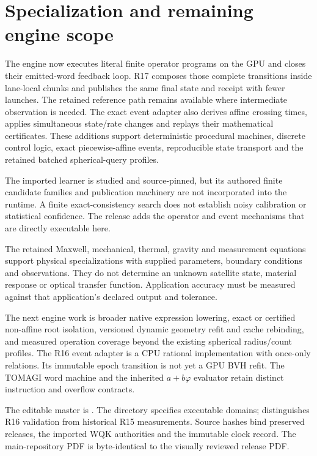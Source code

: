 \section{Specialization and remaining engine scope}
The engine now executes literal finite operator programs on the GPU and
closes their emitted-word feedback loop. R17 composes those complete
transitions inside lane-local chunks and publishes the same final state
and receipt with fewer launches. The retained reference path remains
available where intermediate observation is needed. The exact event adapter also derives
affine crossing times, applies simultaneous state/rate changes and replays
their mathematical certificates. These additions support deterministic
procedural machines, discrete control logic, exact piecewise-affine events,
reproducible state transport and the retained batched spherical-query profiles.

The imported learner is studied and source-pinned, but its authored finite
candidate families and publication machinery are not incorporated into the
runtime. A finite exact-consistency search does not establish noisy calibration
or statistical confidence. The release adds the operator and event mechanisms
that are directly executable here.

The retained Maxwell, mechanical, thermal, gravity and measurement equations
support physical specializations with supplied parameters, boundary conditions
and observations. They do not determine an unknown satellite state, material
response or optical transfer function. Application accuracy must be measured
against that application's declared output and tolerance.

The next engine work is broader native expression lowering, exact or certified
non-affine root isolation, versioned dynamic geometry refit and cache rebinding,
and measured operation coverage beyond the existing spherical radius/count
profiles. The R16 event adapter is a CPU rational implementation with once-only
relations. Its immutable epoch transition is not yet a GPU BVH refit. The
TOMAGI word machine and the inherited $a+b\varphi$ evaluator retain distinct
instruction and overflow contracts.

The editable master is . The  directory
specifies executable domains;  distinguishes R16 validation from
historical R15 measurements. Source hashes bind preserved releases, the imported
WQK authorities and the immutable clock record. The main-repository PDF is
byte-identical to the visually reviewed release PDF.
